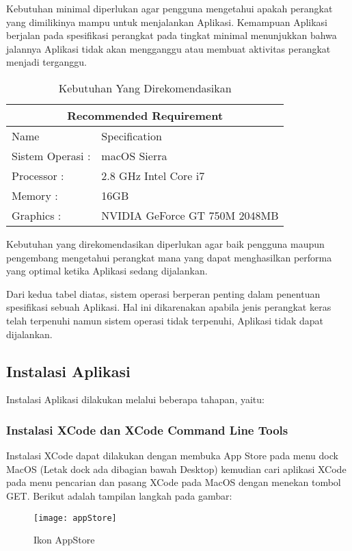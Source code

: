 \documentclass[pi.tex]{subfile}
\begin{document}
Kebutuhan minimal diperlukan agar pengguna mengetahui apakah perangkat yang dimilikinya mampu untuk menjalankan Aplikasi. Kemampuan Aplikasi berjalan pada spesifikasi perangkat pada tingkat minimal menunjukkan bahwa jalannya Aplikasi tidak akan mengganggu atau membuat aktivitas perangkat menjadi terganggu.

\begin{table}[h]
  \centering
\begin{tabular}{ |p{3cm}||p{6cm}|}
  \hline
  \multicolumn{2}{|c|}{Recommended Requirement} 
  \\ \hline
  Name & Specification \\
  \hline
  Sistem Operasi : & macOS Sierra \\
  Processor : & 2.8 GHz Intel Core i7 \\
  Memory : & 16GB \\
  Graphics : & NVIDIA GeForce GT 750M 2048MB \\
  \hline
  
\end{tabular}

\caption{Kebutuhan Yang Direkomendasikan}
\end{table}

Kebutuhan yang direkomendasikan diperlukan agar baik pengguna maupun pengembang mengetahui perangkat mana yang dapat menghasilkan performa yang optimal ketika Aplikasi sedang dijalankan.

Dari kedua tabel diatas, sistem operasi berperan penting dalam penentuan spesifikasi sebuah Aplikasi. Hal ini dikarenakan apabila jenis perangkat keras telah terpenuhi namun sistem operasi tidak terpenuhi, Aplikasi tidak dapat dijalankan.


\subsection{Instalasi Aplikasi}
Instalasi Aplikasi dilakukan melalui beberapa tahapan, yaitu:
\subsubsection{Instalasi XCode dan XCode Command Line Tools}
  Instalasi XCode dapat dilakukan dengan membuka App Store pada menu dock MacOS (Letak dock ada dibagian bawah Desktop) kemudian cari aplikasi XCode pada menu pencarian dan pasang XCode pada MacOS dengan menekan tombol GET. Berikut adalah tampilan langkah pada gambar:
  
  \begin{figure}[H]
      \centering
  \texttt{[image: appStore]}
  \caption[Ikon AppStore]{Ikon AppStore}

  \end{figure}
\end{document}
